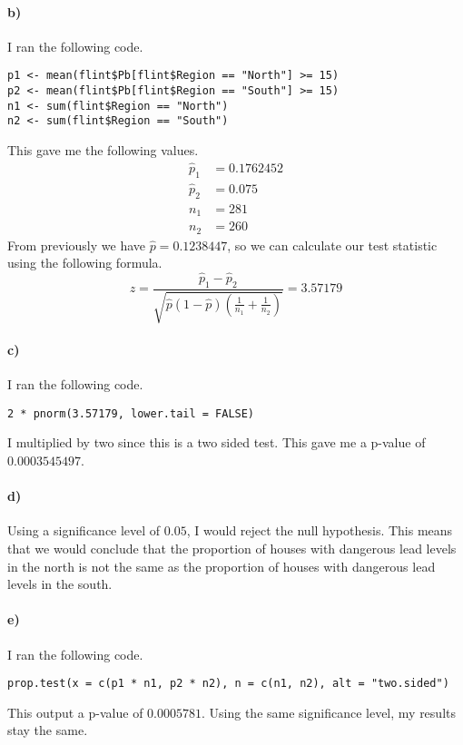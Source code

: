 \documentclass[12pt]{article}
\begin{document}
\paragraph{b)}

I ran the following code.
\begin{verbatim}
p1 <- mean(flint$Pb[flint$Region == "North"] >= 15)
p2 <- mean(flint$Pb[flint$Region == "South"] >= 15)
n1 <- sum(flint$Region == "North")
n2 <- sum(flint$Region == "South")
\end{verbatim}
This gave me the following values.
\begin{align*}
    \hat{p}_1&=0.1762452\\
    \hat{p}_2&=0.075\\
    n_1&=281\\
    n_2&=260
\end{align*}
From previously we have \(\hat{p}=0.1238447\), so we can calculate our
test statistic using the following formula.
\[z=\frac{\hat{p}_1-\hat{p}_2}{\sqrt{\hat{p}(1-\hat{p})\left(\frac{1}{n_1}+\frac{1}{n_2}\right)}}=3.57179\]

\paragraph{c)}

I ran the following code.
\begin{verbatim}
2 * pnorm(3.57179, lower.tail = FALSE)
\end{verbatim}
I multiplied by two since this is a two sided test. This gave me a p-value of \(0.0003545497\).

\paragraph{d)}

Using a significance level of \(0.05\), I would reject the null hypothesis. This means that we would
conclude that the proportion of houses with dangerous lead levels in the north is not the same
as the proportion of houses with dangerous lead levels in the south.

\paragraph{e)}

I ran the following code.
\scriptsize
\begin{verbatim}
prop.test(x = c(p1 * n1, p2 * n2), n = c(n1, n2), alt = "two.sided")
\end{verbatim}
\normalsize
This output a p-value of \(0.0005781\). Using the same significance level, my results stay the same.
\end{document}
